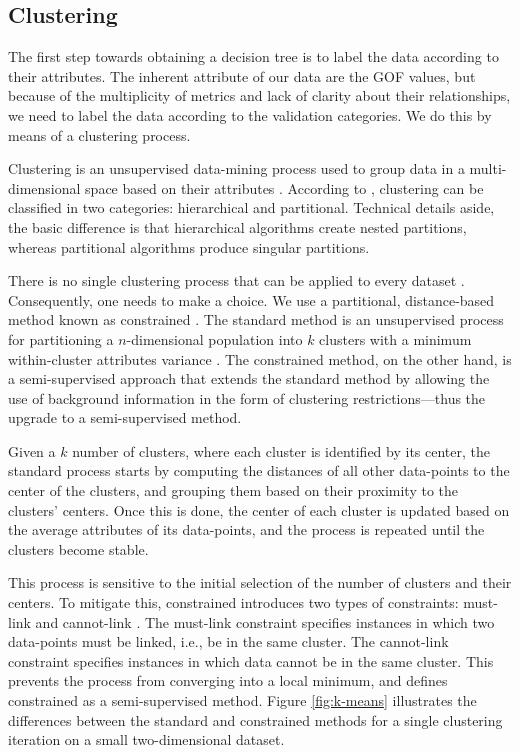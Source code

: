 
\subsection{Clustering}
\label{sec:clustering}

The first step towards obtaining a decision tree is to label the data according to their attributes. The inherent attribute of our data are the GOF values, but because of the multiplicity of metrics and lack of clarity about their relationships, we need to label the data according to the validation categories. We do this by means of a clustering process.

Clustering is an unsupervised data-mining process used to group data in a multi-dimensional space based on their attributes \citep{Fayyad_1996_IEEE}. According to \citet{Jain_1999_ACMCS}, clustering can be classified in two categories: hierarchical and partitional. Technical details aside, the basic difference is that hierarchical algorithms create nested partitions, whereas partitional algorithms produce singular partitions.

There is no single clustering process that can be applied to every dataset \citep{Dy_2004_MLR, Jain_1988_Book, Hartigan_1985_JOC}. Consequently, one needs to make a choice. We use a partitional, distance-based method known as constrained \kmeans{}. The standard \kmeans{} method is an unsupervised process for partitioning a $n$-dimensional population into $k$ clusters with a minimum within-cluster attributes variance \citep[e.g.,][]{Macqueen_1967_Proc}. The constrained \kmeans{} method, on the other hand, is a semi-supervised approach that extends the standard method by allowing the use of background information in the form of clustering restrictions---thus the upgrade to a semi-supervised method.

Given a $k$ number of clusters, where each cluster is identified by its center, the standard process starts by computing the distances of all other data-points to the center of the clusters, and grouping them based on their proximity to the clusters' centers. Once this is done, the center of each cluster is updated based on the average attributes of its data-points, and the process is repeated until the clusters become stable.

This process is sensitive to the initial selection of the number of clusters and their centers. To mitigate this, constrained \kmeans{} introduces two types of constraints: must-link and cannot-link \citep{Wagstaff_2001_Proc}. The must-link constraint specifies instances in which two data-points must be linked, i.e., be in the same cluster. The cannot-link constraint specifies instances in which data cannot be in the same cluster. This prevents the process from converging into a local minimum, and defines constrained \kmeans{} as a semi-supervised method. Figure \ref{fig:k-means} illustrates the differences between the standard and constrained \kmeans{} methods for a single clustering iteration on a small two-dimensional dataset.


